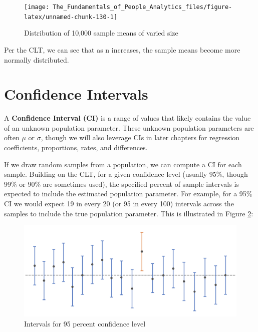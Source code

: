 \documentclass[
]{book}
\begin{document}
\begin{figure}

{\centering \texttt{[image: The\_Fundamentals\_of\_People\_Analytics\_files/figure-latex/unnamed-chunk-130-1]} 

}

\caption{Distribution of 10,000 sample means of varied size}\label{fig:unnamed-chunk-130}
\end{figure}

Per the CLT, we can see that as n increases, the sample means become more normally distributed.

\hypertarget{confidence-intervals}{%
\section{Confidence Intervals}\label{confidence-intervals}}

A \textbf{Confidence Interval (CI)} is a range of values that likely contains the value of an unknown population parameter. These unknown population parameters are often \(\mu\) or \(\sigma\), though we will also leverage CIs in later chapters for regression coefficients, proportions, rates, and differences.

If we draw random samples from a population, we can compute a CI for each sample. Building on the CLT, for a given confidence level (usually 95\%, though 99\% or 90\% are sometimes used), the specified percent of sample intervals is expected to include the estimated population parameter. For example, for a 95\% CI we would expect 19 in every 20 (or 95 in every 100) intervals across the samples to include the true population parameter. This is illustrated in Figure \ref{fig:conf-int}:

\begin{figure}

{\centering \includegraphics[width=0.75\linewidth]{graphics/confidence_intervals} 

}

\caption{Intervals for 95 percent confidence level}\label{fig:conf-int}
\end{figure}
\end{document}
